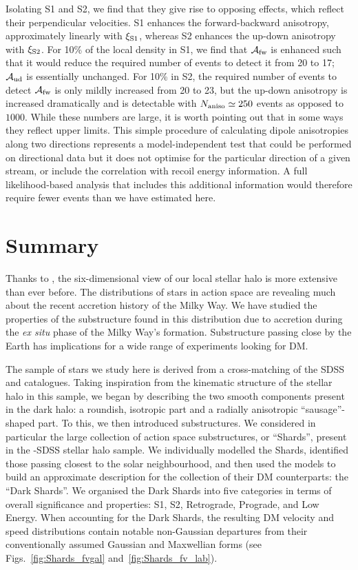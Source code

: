 \documentclass[prd,10pt,twocolumn,showpacs,nofootinbib,aps,superscriptaddress,preprintnumbers]{revtex4-1}
\newcommand{\Gaia}{\!{\it Gaia}\xspace}
\begin{document}
Isolating S1 and S2, we find that they give rise to opposing effects, which reflect 
their perpendicular velocities. S1 enhances the forward-backward anisotropy, 
approximately linearly with $\xi_{\rm S1}$, whereas S2 enhances the 
up-down anisotropy with $\xi_{\rm S2}$. For 10\% of the local density in S1, we find 
that $\mathcal{A}_{\rm fw}$ is enhanced such that it would reduce the required 
number of events to detect it from 20 to 17; $\mathcal{A}_{\rm ud}$ is essentially 
unchanged. For 10\% in S2, the required number of events to detect $\mathcal{A}_{\rm fw}$ 
is only mildly increased from 20 to 23, but the up-down anisotropy is increased 
dramatically and is detectable with $N_{\rm aniso}\simeq 250$ events as opposed to $1000$. 
While these numbers are large, it is worth pointing out that in some ways they 
reflect upper limits. This simple procedure of calculating dipole anisotropies 
along two directions represents a model-independent test that could be
performed on directional data but it does not optimise for the particular direction 
of a given stream, or include the correlation with recoil energy information. A full likelihood-based 
analysis that includes this additional information would therefore require fewer events than we have estimated here.
 



\section{Summary}\label{sec:summary}

Thanks to \Gaia, the six-dimensional view of our local stellar halo is more extensive than ever before. The distributions of stars in action space are revealing much about the recent accretion history of the Milky Way. We have studied the properties of the substructure found in this distribution due to accretion during the {\it ex situ} phase of the Milky Way's formation. Substructure passing close by the Earth has implications for a wide range of experiments looking for DM.

The sample of stars we study here is derived from a cross-matching of the SDSS and \Gaia catalogues. Taking inspiration from the kinematic structure of the stellar halo in this sample, we began by describing the two smooth components present in the dark halo: a roundish, isotropic part and a radially anisotropic ``sausage''-shaped part. To this, we then introduced substructures. We considered in particular the large collection of action space substructures, or ``Shards'', present in the \Gaia-SDSS stellar halo sample. We individually modelled the Shards, identified those passing closest to the solar neighbourhood, and then used the models to build an approximate description for the collection of their DM counterparts: the ``Dark Shards''. We organised the Dark Shards into five categories in terms of overall significance and properties: S1, S2, Retrograde, Prograde, and Low Energy. When accounting for the Dark Shards, the resulting DM velocity and speed distributions contain notable non-Gaussian departures from their conventionally assumed Gaussian and Maxwellian forms (see Figs.~\ref{fig:Shards_fvgal} and~\ref{fig:Shards_fv_lab}).
\end{document}

